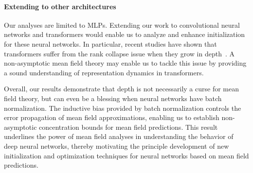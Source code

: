 \paragraph{Extending to other architectures}
Our analyses are limited to MLPs. Extending our work to convolutional neural networks and transformers would enable us to analyze and enhance initialization for these neural networks. In particular, recent studies have shown that transformers suffer from the rank collapse issue when they grow in depth~\cite{anagnostidissignal}. A non-asymptotic mean field theory may enable us to tackle this issue by providing a sound understanding of representation dynamics in transformers.

Overall, our results demonstrate that depth is not necessarily a curse for mean field theory, but can even be a blessing when neural networks have batch normalization. The inductive bias provided by batch normalization controls the error propagation of mean field approximations, enabling us to establish non-asymptotic concentration bounds for mean field predictions. This result underlines the power of mean field analyses in understanding the behavior of deep neural networks, thereby motivating the principle development of new initialization and optimization techniques for neural networks based on mean field predictions. 


